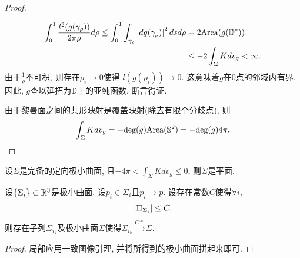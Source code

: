 \begin{proof}
\begin{claim}
\begin{subproof}
            \begin{equation}
                \begin{split}
                    \int^1_0 \frac{l^2(g(\gamma_\rho))}{2\pi\rho} d\rho \le \int^1_0 \int_{\gamma_\rho} \left | dg(\gamma_\rho) \right |^2dsd\rho &= 2\text{Area}(g({\mathbb{D}}^*))  \\
                    &\le -2\int_\Sigma Kdv_g<\infty.
                \end{split}
            \end{equation}
            由于$\frac{1}{\rho}$不可积, 则存在$\rho_i \to 0$使得  $l(g(\rho_i)) \to 0$. 这意味着$g$在0点的邻域内有界. 因此, $g$查以延拓为$\mathbb{D}$上的亚纯函数. 断言得证.
        \end{subproof}
    \end{claim}
    \par  由于黎曼面之间的共形映射是覆盖映射(除去有限个分歧点), 则
    \begin{equation}
        \int_\Sigma Kdv_g = - \text{deg}(g) \text{Area}(\mathbb{S}^2) = -\text{deg}(g)4\pi.
    \end{equation}
\end{proof}
\begin{corollary}\label{flatness_4pi}
    设$\Sigma$是完备的定向极小曲面, 且$-4\pi < \int_\Sigma K dv_g \le 0$, 则$\Sigma$是平面.
\end{corollary}
\begin{theorem} \label{compactness}
    设$\{\Sigma_i \} \subset \mathbb{R}^3$是极小曲面. 设$p_i \in \Sigma_i$且$p_i \to p$.  设存在常数$C$使得$\forall i$,
    \begin{equation}
        \left | {\Pi}_{\Sigma_i} \right | \le C.
    \end{equation}
    则存在子列$\Sigma_{i_k}$及极小曲面$\Sigma$使得$\Sigma_{i_k} \overset{C^\infty}{\longrightarrow} \Sigma$.
\end{theorem}
\begin{proof}
    局部应用一致图像引理, 并将所得到的极小曲面拼起来即可.
\end{proof}
